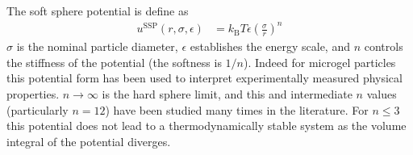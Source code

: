 The soft sphere potential is define as
\begin{align}
u^\text{SSP}(r,\sigma,\epsilon) &=
k_\text{B} T \epsilon \left(\frac{\sigma}{r}\right)^n
\end{align}
$\sigma$ is the nominal particle diameter, $\epsilon$ establishes the
energy scale, and $n$ controls the stiffness of the potential (the
softness is $1/n$). Indeed for microgel particles this potential
form has been used to interpret experimentally measured
physical properties. $n\rightarrow\infty$ is the hard sphere limit, and this
and intermediate $n$ values (particularly $n=12$) have been
studied many times in the literature. For $n\leq 3$
this potential does not lead to a thermodynamically stable
system as the volume integral of the potential diverges.



